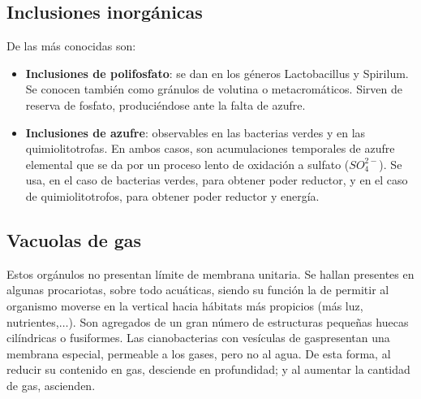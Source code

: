 \subsection{Inclusiones inorgánicas}
De las más conocidas son:
\begin{itemize}[itemsep=0pt,parsep=0pt,topsep=0pt,partopsep=0pt]
	\item \textbf{Inclusiones de polifosfato}: se dan en los géneros Lactobacillus y Spirilum. Se conocen también como gránulos de volutina o metacromáticos. Sirven de reserva de fosfato, produciéndose ante la falta de azufre.
	\item \textbf{Inclusiones de azufre}: observables en las bacterias verdes y en las quimiolitotrofas. En ambos casos, son acumulaciones temporales de azufre elemental que se da por un proceso lento de oxidación a sulfato ($SO_4^{2-}$). Se usa, en el caso de bacterias verdes, para obtener poder reductor, y en el caso de quimiolitotrofos, para obtener poder reductor y energía.
\end{itemize}
\subsection{Vacuolas de gas}
Estos orgánulos no presentan límite de membrana unitaria. Se hallan presentes en algunas procariotas, sobre todo acuáticas, siendo su función la de permitir al organismo moverse en la vertical hacia hábitats más propicios (más luz, nutrientes,$\dots$). Son agregados de un gran número de estructuras pequeñas huecas cilíndricas o fusiformes. Las cianobacterias con vesículas de gaspresentan una membrana especial, permeable a los gases, pero no al agua. De esta forma, al reducir su contenido en gas, desciende en profundidad; y al aumentar la cantidad de gas, ascienden.